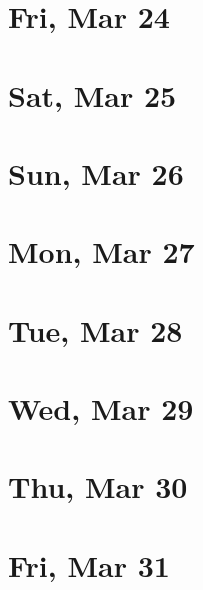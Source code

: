 	\section{Fri, Mar 24}
		
	\section{Sat, Mar 25}
		
	\section{Sun, Mar 26}
		
	\section{Mon, Mar 27}
		
	\section{Tue, Mar 28}
		
	\section{Wed, Mar 29}
		
	\section{Thu, Mar 30}
		
	\section{Fri, Mar 31}
		
